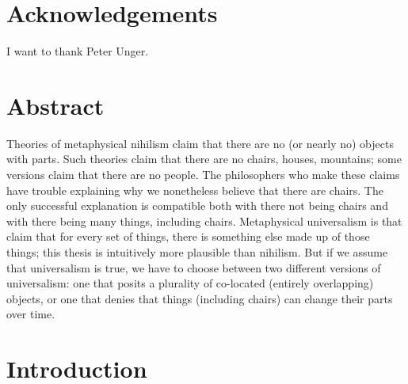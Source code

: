 \documentclass[12pt,twoside]{reedfancy}
\begin{document}
\begin{spacing}{1.25}

    \chapter*{Acknowledgements}
	I want to thank Peter Unger.


    \tableofcontents

\chapter*{Abstract}
Theories of metaphysical nihilism claim that there are no (or nearly
no) objects with parts.  Such theories claim that there are no chairs,
houses, mountains; some versions claim that there are no people.  The
philosophers who make these claims have trouble explaining why we
nonetheless believe that there are chairs.  The only successful
explanation is compatible both with there not being chairs and with
there being many things, including chairs.  Metaphysical universalism
is that claim that for every set of things, there is something else
made up of those things; this thesis is intuitively more plausible
than nihilism.  But if we assume that universalism is true, we have to
choose between two different versions of universalism: one that posits
a plurality of co-located (entirely overlapping) objects, or one that
denies that things (including chairs) can change their parts over
time.

\mainmatter %
\pagestyle{fancyplain} %
  
\chapter*{Introduction}



\end{spacing}
\end{document}
